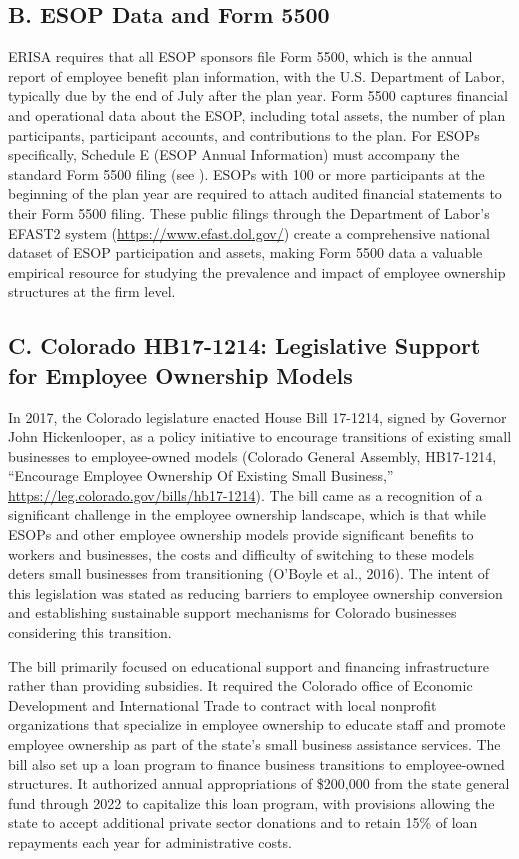 \documentclass[12pt]{article}
\begin{document}
\subsection*{B. ESOP Data and Form 5500}

ERISA requires that all ESOP sponsors file Form 5500, which is the annual report of employee benefit plan information, with the U.S. Department of Labor, typically due by the end of July after the plan year. Form 5500 captures financial and operational data about the ESOP, including total assets, the number of plan participants, participant accounts, and contributions to the plan. For ESOPs specifically, Schedule E (ESOP Annual Information) must accompany the standard Form 5500 filing (see \citep{DOLForm5500ScheduleE}). ESOPs with 100 or more participants at the beginning of the plan year are required to attach audited financial statements to their Form 5500 filing. These public filings through the Department of Labor's EFAST2 system (\url{https://www.efast.dol.gov/}) create a comprehensive national dataset of ESOP participation and assets, making Form 5500 data a valuable empirical resource for studying the prevalence and impact of employee ownership structures at the firm level.

\subsection*{C. Colorado HB17-1214: Legislative Support for Employee Ownership Models}

In 2017, the Colorado legislature enacted House Bill 17-1214, signed by Governor John Hickenlooper, as a policy initiative to encourage transitions of existing small businesses to employee-owned models (Colorado General Assembly, HB17-1214, ``Encourage Employee Ownership Of Existing Small Business,'' \url{https://leg.colorado.gov/bills/hb17-1214}). The bill came as a recognition of a significant challenge in the employee ownership landscape, which is that while ESOPs and other employee ownership models provide significant benefits to workers and businesses, the costs and difficulty of switching to these models deters small businesses from transitioning (O'Boyle et al., 2016). The intent of this legislation was stated as reducing barriers to employee ownership conversion and establishing sustainable support mechanisms for Colorado businesses considering this transition.

The bill primarily focused on educational support and financing infrastructure rather than providing subsidies. It required the Colorado office of Economic Development and International Trade to contract with local nonprofit organizations that specialize in employee ownership to educate staff and promote employee ownership as part of the state's small business assistance services. The bill also set up a loan program to finance business transitions to employee-owned structures. It authorized annual appropriations of \$200,000 from the state general fund through 2022 to capitalize this loan program, with provisions allowing the state to accept additional private sector donations and to retain 15\% of loan repayments each year for administrative costs.
\end{document}
